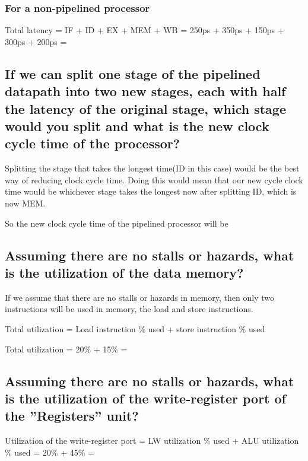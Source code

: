 \documentclass{article}
\begin{document}
\subsubsection*{For a non-pipelined processor}

Total latency = IF + ID + EX + MEM + WB =  250ps + 350ps + 150ps + 300ps + 200ps = 

\subsection{If we can split one stage of the pipelined datapath
into two new stages, each with half the latency of the
original stage, which stage would you split and what
is the new clock cycle time of the processor?}

\noindent Splitting the stage that takes the longest time(ID in this case) would be the best way of reducing
clock cycle time. Doing this would mean that our new cycle clock time would be whichever stage takes the longest
now after splitting ID, which is now MEM. 

So the new clock cycle time of the pipelined processor will be 

\subsection{Assuming there are no stalls or hazards, what is the
utilization of the data memory?}

If we assume that there are no stalls or hazards in memory, then only two instructions will be used
in memory, the load and store instructions.

Total utilization = Load instruction \% used + store instruction \% used

Total utilization = 20\% + 15\% = 

\subsection{Assuming there are no stalls or hazards, what is the
utilization of the write-register port of the ”Registers”
unit?}

Utilization of the write-register port = LW utilization \% used + ALU utilization \% used = 20\% + 45\% = 
\end{document}
